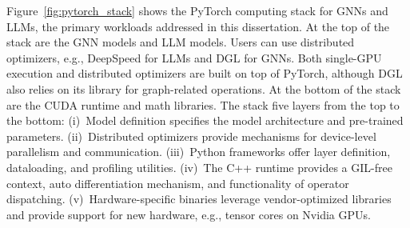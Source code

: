 Figure~\ref{fig:pytorch_stack} shows the PyTorch computing stack for GNNs and LLMs, the primary workloads addressed in this dissertation. At the top of the stack are the GNN models and LLM models. Users can use distributed optimizers, e.g., DeepSpeed for LLMs and DGL for GNNs. Both single-GPU execution and distributed optimizers are built on top of PyTorch, although DGL also relies on its library for graph-related operations. At the bottom of the stack are the CUDA runtime and math libraries. The stack  five layers from the top to the bottom: (i)~Model definition specifies the model architecture and pre-trained parameters. (ii)~Distributed optimizers provide mechanisms for device-level parallelism and communication. (iii)~Python frameworks offer layer definition, dataloading, and profiling utilities. (iv)~The C++ runtime provides a GIL-free context, auto differentiation mechanism, and functionality of operator dispatching. (v)~Hardware-specific binaries  leverage vendor-optimized libraries and provide support for new hardware, e.g., tensor cores on Nvidia GPUs. ~\cite{wenzeljakobPybindPybind112016} 

